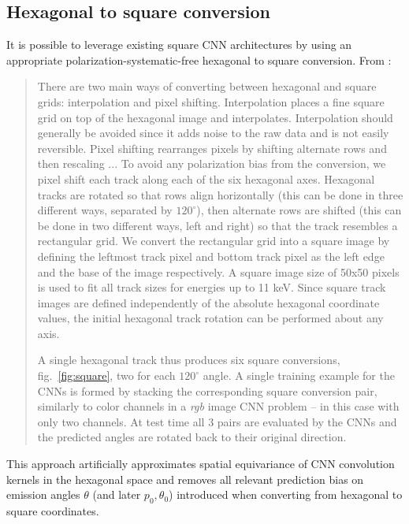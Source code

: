 \subsection{Hexagonal to square conversion}
It is possible to leverage existing square CNN architectures by using an appropriate polarization-systematic-free hexagonal to square conversion. From \citet{peirson_deep_2021}:
\begin{quotation}
There are two main ways of converting between hexagonal and square grids: interpolation and pixel shifting. Interpolation places a fine square grid on top of the hexagonal image and interpolates.
Interpolation should generally be avoided since it adds noise to the raw data and is not easily reversible.
Pixel shifting rearranges pixels by shifting alternate rows and then rescaling \citep{steppa_hexagdly_2019} ... To avoid any polarization bias from the conversion, we pixel shift each track along each of the six hexagonal axes. Hexagonal tracks are rotated so that rows align horizontally (this can be done in three different ways, separated by $120^{\circ}$), then alternate rows are shifted (this can be done in two different ways, left and right) so that the track resembles a rectangular grid. We convert the rectangular grid into a square image by defining the leftmost track pixel and bottom track pixel as the left edge and the base of the image respectively. A square image size of 50x50 pixels is used to fit all track sizes for energies up to 11 keV.
Since square track images are defined independently of the absolute hexagonal coordinate values, the initial hexagonal track rotation can be performed about any axis.


A single hexagonal track thus produces six square conversions, fig.~\ref{fig:square}, two for each $120^{\circ}$ angle.
A single training example for the CNNs is formed by stacking the corresponding square conversion pair, similarly to color channels in a \textit{rgb} image CNN problem -- in this case with only two channels. At test time all 3 pairs are evaluated by the CNNs and the predicted angles are rotated back to their original direction. 
\end{quotation}
This approach artificially approximates spatial equivariance of CNN convolution kernels in the hexagonal space and removes all relevant prediction bias on emission angles $\theta$ (and later $p_0, \theta_0$) introduced when converting from hexagonal to square coordinates.


